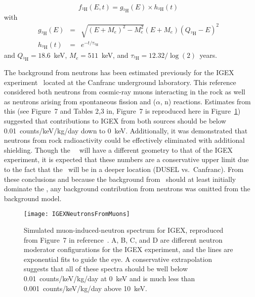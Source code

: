 		\begin{equation}
			f_{^{3}\text{H}}\left(E, t\right)  =  g_{^{3}\text{H}}\left(E\right) \times h_{^{3}\text{H}}\left(t\right) 
		\end{equation}
		with
		\begin{eqnarray}
		g_{^{3}\text{H}}\left(E\right) & = & \sqrt{(E + M_e)^2 - M_e^2} \left(
			E + M_e \right) \left( Q_{^3\text{H}} - E \right)^2 \\
h_{^{3}\text{H}}\left(t\right) & = & e^{-t/\tau_{^3\text{H}}}
		\end{eqnarray}
		and $Q_{^3\text{H}}=18.6$~keV, $M_{e}=511$~keV, and $\tau_{^3\text{H}} = 12.32 / \log(2)$~years.
		
	The background from neutrons has been estimated previously for the IGEX experiment~\cite{Carmona2004523} located at the Canfranc underground laboratory.  This reference considered both neutrons from cosmic-ray muons interacting in the rock as well as neutrons arising from spontaneous fission and ($\alpha$, n) reactions.  Estimates from this (see Figure~7 and Tables 2,3 in\cite{Carmona2004523}, Figure~7 is reproduced here in Figure~\ref{fig:IGEXNeutrons}) suggested that contributions to IGEX from both sources should be below 0.01~counts/keV/kg/day down to 0~keV.  Additionally, it was demonstrated that neutrons from rock radioactivity could be effectively eliminated with additional shielding.  Though the \MJ~\minmod~will have a different geometry to that of the IGEX experiment, it is expected that these numbers are a conservative upper limit due to the fact that the \minmod~will be in a deeper location (DUSEL vs.~Canfranc).  From these conclusions and because the background from \hthree~should at least initially dominate the \minmod, any background contribution from neutrons was omitted from the background model.
	
			\begin{figure}
				\centering
				\texttt{[image: IGEXNeutronsFromMuons]}
				\caption[Simulated muon-induced-neutron spectrum for IGEX.]{Simulated muon-induced-neutron 
				spectrum for IGEX, reproduced from Figure~7 in reference~\cite{Carmona2004523}.  A, B, C, and D are different
				neutron moderator configurations for the IGEX experiment, and the lines are exponential fits to guide the eye.
				A conservative extrapolation suggests that all of these spectra should be well below 0.01~counts/keV/kg/day at
				0~keV and is much less than 0.001~counts/keV/kg/day above 10~keV.}
				\label{fig:IGEXNeutrons}
			\end{figure}
	
